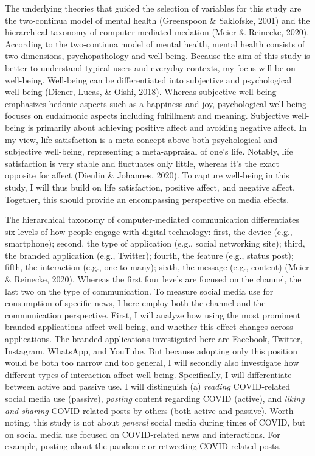 \documentclass[
  english,
  man,floatsintext]{apa6}
\begin{document}
The underlying theories that guided the selection of variables for this study are the two-continua model of mental health (Greenspoon \& Saklofske, 2001) and the hierarchical taxonomy of computer-mediated medation (Meier \& Reinecke, 2020).
According to the two-continua model of mental health, mental health consists of two dimensions, psychopathology and well-being.
Because the aim of this study is better to understand typical users and everyday contexts, my focus will be on well-being.
Well-being can be differentiated into subjective and psychological well-being (Diener, Lucas, \& Oishi, 2018).
Whereas subjective well-being emphasizes hedonic aspects such as a happiness and joy, psychological well-being focuses on eudaimonic aspects including fulfillment and meaning.
Subjective well-being is primarily about achieving positive affect and avoiding negative affect.
In my view, life satisfaction is a meta concept above both psychological and subjective well-being, representing a meta-appraisal of one's life.
Notably, life satisfaction is very stable and fluctuates only little, whereas it's the exact opposite for affect (Dienlin \& Johannes, 2020).
To capture well-being in this study, I will thus build on life satisfaction, positive affect, and negative affect.
Together, this should provide an encompassing perspective on media effects.

The hierarchical taxonomy of computer-mediated communication differentiates six levels of how people engage with digital technology:
first, the device (e.g., smartphone); second, the type of application (e.g., social networking site); third, the branded application (e.g., Twitter); fourth, the feature (e.g., status post); fifth, the interaction (e.g., one-to-many); sixth, the message (e.g., content) (Meier \& Reinecke, 2020).
Whereas the first four levels are focused on the channel, the last two on the type of communication.
To measure social media use for consumption of specific news, I here employ both the channel and the communication perspective.
First, I will analyze how using the most prominent branded applications affect well-being, and whether this effect changes across applications.
The branded applications investigated here are Facebook, Twitter, Instagram, WhatsApp, and YouTube.
But because adopting only this position would be both too narrow and too general, I will secondly also investigate how different types of interaction affect well-being.
Specifically, I will differentiate between active and passive use.
I will distinguish (a) \emph{reading} COVID-related social media use (passive), \emph{posting} content regarding COVID (active), and \emph{liking and sharing} COVID-related posts by others (both active and passive).
Worth noting, this study is not about \emph{general} social media during times of COVID, but on social media use focused on COVID-related news and interactions.
For example, posting about the pandemic or retweeting COVID-related posts.
\end{document}

